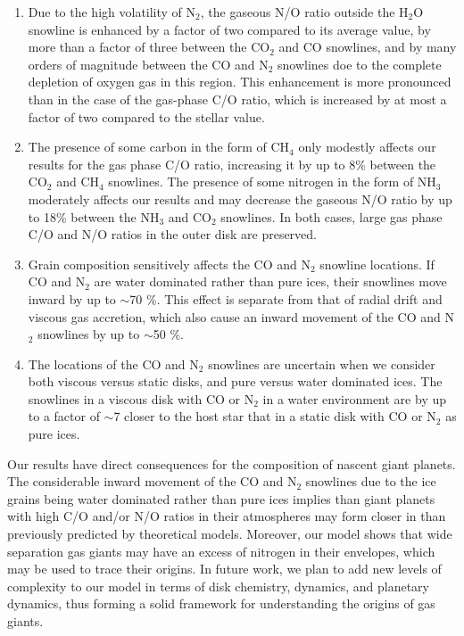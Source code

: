 \documentclass[apj]{emulateapj}
\begin{document}
\begin{enumerate}

\item Due to the high volatility of N$_2$, the gaseous N/O ratio outside the H$_2$O snowline is enhanced by a factor of two compared to its average value, by more than a factor of three between the CO$_2$ and CO snowlines, and by many orders of magnitude between the CO and N$_2$ snowlines doe to the complete depletion of oxygen gas in this region. This enhancement is more pronounced than in the case of the gas-phase C/O ratio, which is increased by at most a factor of two compared to the stellar value. %

\item The presence of some carbon in the form of CH$_4$ only modestly affects our results for the gas phase C/O ratio, increasing it by up to 8\% between the CO$_2$ and CH$_4$ snowlines. The presence of some nitrogen in the form of NH$_3$ moderately affects our results and may decrease the gaseous N/O ratio by up to 18\% between the NH$_3$ and CO$_2$ snowlines. In both cases, large gas phase C/O and N/O ratios in the outer disk are preserved.

\item Grain composition sensitively affects the CO and N$_2$ snowline locations. If CO and N$_2$ are water dominated rather than pure ices, their snowlines move inward by up to $\sim$70 \%. This effect is separate from that of radial drift and viscous gas accretion, which also cause an inward movement of the CO and N$_2$ snowlines by up to $\sim$50 \%. 

\item The locations of the CO and N$_2$ snowlines are uncertain when we consider both viscous versus static disks, and pure versus water dominated ices. The snowlines in a viscous disk with CO or N$_2$ in a water environment are by up to a factor of $\sim$7 closer to the host star that in a static disk with CO or N$_2$ as pure ices. 

\end{enumerate}

Our results have direct consequences for the composition of nascent giant planets. The considerable inward movement of the CO and N$_2$ snowlines due to the ice grains being water dominated rather than pure ices implies than giant planets with high C/O and/or N/O ratios in their atmospheres may form closer in than previously predicted by theoretical models. Moreover, our model shows that wide separation gas giants may have an excess of nitrogen in their envelopes, which may be used to trace their origins. In future work, we plan to add new levels of complexity to our model in terms of disk chemistry, dynamics, and planetary dynamics, thus forming a solid framework for understanding the origins of gas giants. 
\end{document}
